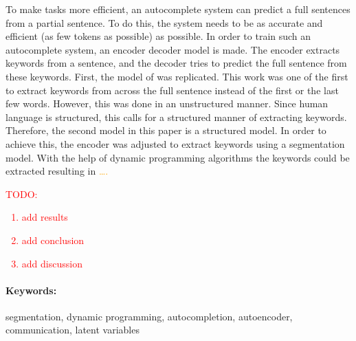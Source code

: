 To make tasks more efficient, an autocomplete system can predict a full sentences from a partial sentence.
To do this, the system needs to be as accurate and efficient (as few tokens as possible) as possible. 
In order to train such an autocomplete system, an encoder decoder model is made. 
The encoder extracts keywords from a sentence, and the decoder tries to predict the full sentence from these keywords.
First, the model of  was replicated. 
This work was one of the first to extract keywords from across the full sentence instead of the first or the last few words. 
However, this was done in an unstructured manner. 
Since human language is structured, this calls for a structured manner of extracting keywords. 
Therefore, the second model in this paper is a structured model. 
In order to achieve this, the encoder was adjusted to extract keywords using a segmentation model. 
With the help of dynamic programming algorithms the keywords could be extracted resulting in \textcolor{orange}{\dots.}

\textcolor{red}{TODO:\begin{enumerate}
    \item add results
    \item add conclusion
    \item add discussion
\end{enumerate}}

\paragraph{Keywords:} segmentation, dynamic programming, autocompletion, autoencoder, communication, latent variables